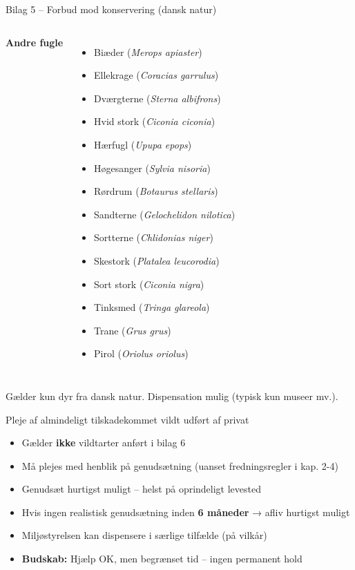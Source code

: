 \begin{frame}{Bilag 5 – Forbud mod konservering (dansk natur)}
\begin{columns}[T]
\textbf{Andre fugle}
\begin{itemize}
  \item Biæder (\textit{Merops apiaster})
  \item Ellekrage (\textit{Coracias garrulus})
  \item Dværgterne (\textit{Sterna albifrons})
  \item Hvid stork (\textit{Ciconia ciconia})
  \item Hærfugl (\textit{Upupa epops})
  \item Høgesanger (\textit{Sylvia nisoria})
  \item Rørdrum (\textit{Botaurus stellaris})
  \item Sandterne (\textit{Gelochelidon nilotica})
  \item Sortterne (\textit{Chlidonias niger})
  \item Skestork (\textit{Platalea leucorodia})
  \item Sort stork (\textit{Ciconia nigra})
  \item Tinksmed (\textit{Tringa glareola})
  \item Trane (\textit{Grus grus})
  \item Pirol (\textit{Oriolus oriolus})
\end{itemize}
\end{columns}
\tiny
Gælder kun dyr fra dansk natur. Dispensation mulig (typisk kun museer mv.).
\end{frame}

\begin{frame}{Pleje af almindeligt tilskadekommet vildt udført af privat}
\begin{itemize}
  \item Gælder \textbf{ikke} vildtarter anført i bilag 6
  \item Må plejes med henblik på genudsætning (uanset fredningsregler i kap. 2-4)
  \item Genudsæt hurtigst muligt – helst på oprindeligt levested
  \item Hvis ingen realistisk genudsætning inden \textbf{6 måneder} → afliv hurtigst muligt
  \item Miljøstyrelsen kan dispensere i særlige tilfælde (på vilkår)
  \item \textbf{Budskab:} Hjælp OK, men begrænset tid – ingen permanent hold
\end{itemize}
\end{frame}

